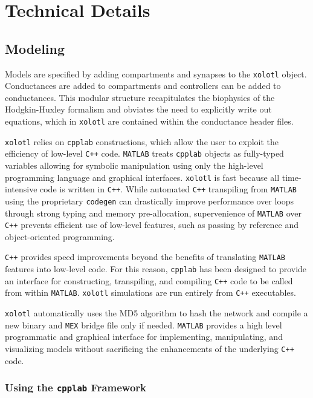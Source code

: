 \documentclass{frontiersSCNS} %
\begin{document}
\section{Technical Details}

\subsection{Modeling}

Models are specified by adding compartments and synapses to the \texttt{xolotl} object. Conductances are added to compartments and controllers can be added to conductances. This modular structure recapitulates the biophysics of the Hodgkin-Huxley formalism and obviates the need to explicitly write out equations, which in \texttt{xolotl} are contained within the conductance header files.

\texttt{xolotl} relies on \texttt{cpplab} constructions, which allow the user to exploit the efficiency of low-level \texttt{C++} code. \texttt{MATLAB} treats \texttt{cpplab} objects as fully-typed variables allowing for symbolic manipulation using only the high-level programming language and graphical interfaces. \texttt{xolotl} is fast because all time-intensive code is written in \texttt{C++}. While automated \texttt{C++} transpiling from \texttt{MATLAB} using the proprietary \texttt{codegen} can drastically improve performance over loops through strong typing and memory pre-allocation, supervenience of \texttt{MATLAB} over \texttt{C++} prevents efficient use of low-level features, such as passing by reference and object-oriented programming. 

\texttt{C++} provides speed improvements beyond the benefits of translating \texttt{MATLAB} features into low-level code. For this reason, \texttt{cpplab} has been designed to provide an interface for constructing, transpiling, and compiling \texttt{C++} code to be called from within \texttt{MATLAB}. \texttt{xolotl} simulations are run entirely from \texttt{C++} executables. 

\texttt{xolotl} automatically uses the MD5 algorithm to hash the network and compile a new binary and \texttt{MEX} bridge file only if needed. \texttt{MATLAB} provides a high level programmatic and graphical interface for implementing, manipulating, and visualizing models without sacrificing the enhancements of the underlying \texttt{C++} code.

\subsubsection{Using the \texttt{cpplab} Framework}
\end{document}
